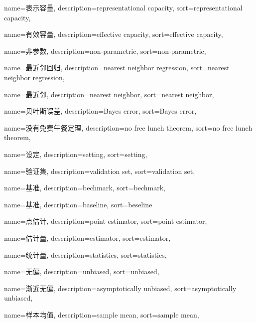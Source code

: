 {
  name=表示容量,
  description={representational capacity},
  sort={representational capacity},
}

{
  name=有效容量,
  description={effective capacity},
  sort={effective capacity},
}

{
  name=非参数,
  description={non-parametric},
  sort={non-parametric},
}

{
  name=最近邻回归,
  description={nearest neighbor regression},
  sort={nearest neighbor regression},
}

{
  name=最近邻,
  description={nearest neighbor},
  sort={nearest neighbor},
}

{
  name=贝叶斯误差,
  description={Bayes error},
  sort={Bayes error},
}

{
  name=没有免费午餐定理,
  description={no free lunch theorem},
  sort={no free lunch theorem},
}

{
  name=设定,
  description={setting},
  sort={setting},
}

{
  name=验证集,
  description={validation set},
  sort={validation set},
}

{
  name=基准,
  description={bechmark},
  sort={bechmark},
}

{
  name=基准,
  description={baseline},
  sort={beseline}
}

{
  name=点估计,
  description={point estimator},
  sort={point estimator},
}

{
  name=估计量,
  description={estimator},
  sort={estimator},
}

{
  name=统计量,
  description={statistics},
  sort={statistics},
}

{
  name=无偏,
  description={unbiased},
  sort={unbiased},
}

{
  name=渐近无偏,
  description={asymptotically unbiased},
  sort={asymptotically unbiased},
}

{
  name=样本均值, %
  description={sample mean},
  sort={sample mean},
}

